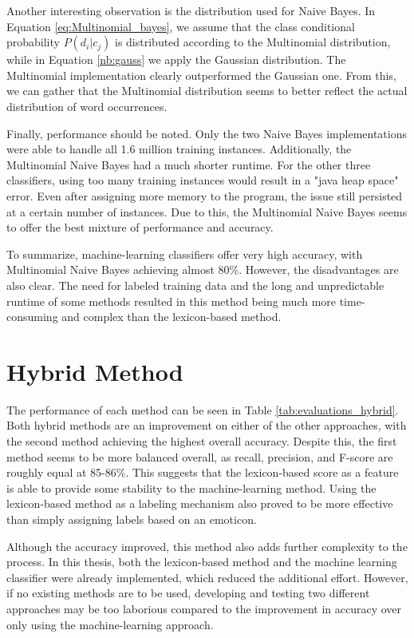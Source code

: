 Another interesting observation is the distribution used for Naive Bayes. In Equation \eqref{eq:Multinomial_bayes}, we assume that the class conditional probability $P(d_i|c_j)$ is distributed according to the Multinomial distribution, while in Equation \eqref{nb:gauss} we apply the Gaussian distribution. The Multinomial implementation clearly outperformed the Gaussian one. From this, we can gather that the Multinomial distribution seems to better reflect the actual distribution of word occurrences.

Finally, performance should be noted. Only the two Naive Bayes implementations were able to handle all 1.6 million training instances. Additionally, the Multinomial Naive Bayes had a much shorter runtime. For the other three classifiers, using too many training instances would result in a "java heap space" error. Even after assigning more memory to the program, the issue still persisted at a certain number of instances. Due to this, the Multinomial Naive Bayes seems to offer the best mixture of performance and accuracy.

To summarize, machine-learning classifiers offer very high accuracy, with Multinomial Naive Bayes achieving almost 80\%. However, the disadvantages are also clear. The need for labeled training data and the long and unpredictable runtime of some methods resulted in this method being much more time-consuming and complex than the lexicon-based method. 

\section{Hybrid Method}

The performance of each method can be seen in Table \ref{tab:evaluations_hybrid}. Both hybrid methods are an improvement on either of the other approaches, with the second method achieving the highest overall accuracy. Despite this, the first method seems to be more balanced overall, as recall, precision, and F-score are roughly equal at 85-86\%. This suggests that the lexicon-based score as a feature is able to provide some stability to the machine-learning method. Using the lexicon-based method as a labeling mechanism also proved to be more effective than simply assigning labels based on an emoticon. 

Although the accuracy improved, this method also adds further complexity to the process. In this thesis, both the lexicon-based method and the machine learning classifier were already implemented, which reduced the additional effort. However, if no existing methods are to be used, developing and testing two different approaches may be too laborious compared to the improvement in accuracy over only using the machine-learning approach.

